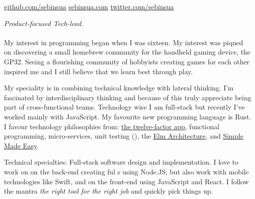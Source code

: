 \documentclass[10pt,a4paper]{article}
\begin{document}
\sloppy  %


\nobreakvspace{0.3em}  %

\noindent\href{http://github.com/sebinsua}{github.com/sebinsua}\sbull
\href{http://sebinsua.com}{sebinsua.com}\sbull
\href{http://twitter.com/sebinsua}{twitter.com/sebinsua}

\spacedhrule{0.9em}{-0.4em}  %


\vspace{-1.3em}  %
\begin{multicols}{2}  %
\noindent \emph{Product-focused Tech-lead.}
\\
\\
My interest in programming began when I was sixteen. My interest was piqued on discovering a small homebrew community for the handheld gaming device, the GP32. Seeing a flourishing community of hobbyists creating games for each other inspired me and I still believe that we learn best through play.\newline

My speciality is in combining technical knowledge with lateral thinking. I'm fascinated by interdisciplinary thinking and because of this truly appreciate being part of cross-functional teams. Technology wise I am full-stack but recently I've worked mainly with JavaScript. My favourite new programming language is Rust. I favour technology philosophies from: \href{http://12factor.net}{the twelve-factor app}, functional programming, micro-services, unit testing  (), the \href{https://github.com/evancz/elm-architecture-tutorial/}{Elm Architecture}, and \href{http://infoq.com/presentations/Simple-Made-Easy}{Simple Made Easy}.\newline

\end{multicols}

\inlineheadsection  %
  {Technical specialties:}
  {Full-stack software design and implementation. I love to work on on the back-end creating ful s using Node.JS; but also work with mobile technologies like Swift, and on the front-end using JavaScript and React. I follow the mantra \emph{the right tool for the right job} and quickly pick things up.}
\end{document}
